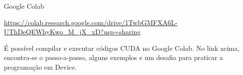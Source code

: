\begin{frame}[t]{Google Colab}
    \Large{
    \begin{shaded}
        \url{https://colab.research.google.com/drive/1TwbGMFXA6L-UThDeQEWhyKwo_M_jX_xD?usp=sharing}
    \end{shaded}
    }
    \justifying
    É possível compilar e executar códigos CUDA no Google Colab. No link acima, encontra-se o passo-a-passo, alguns exemplos e um desafio para praticar a programação em Device.
\end{frame}
